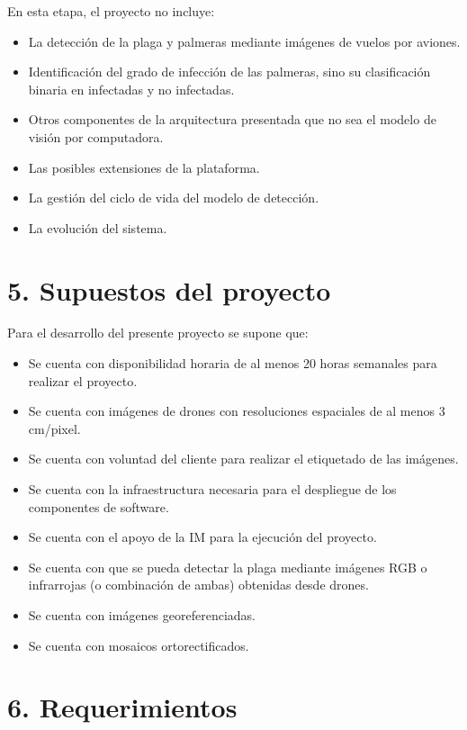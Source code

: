\documentclass[
11pt, %
]{charter}
\begin{document}
En esta etapa, el proyecto no incluye:
\begin{itemize}
  \item La detección de la plaga y palmeras mediante imágenes de vuelos por aviones.
  \item Identificación del grado de infección de las palmeras, sino su clasificación binaria en infectadas y no infectadas.
  \item Otros componentes de la arquitectura presentada que no sea el modelo de visión por computadora.
  \item Las posibles extensiones de la plataforma.
  \item La gestión del ciclo de vida del modelo de detección.
  \item La evolución del sistema.
\end{itemize}

\section{5. Supuestos del proyecto}
\label{sec:supuestos}


Para el desarrollo del presente proyecto se supone que:

\begin{itemize}

  \item Se cuenta con disponibilidad horaria de al menos 20 horas semanales para realizar el proyecto.
  \item Se cuenta con imágenes de drones con resoluciones espaciales de al menos 3 cm/pixel.
  \item Se cuenta con voluntad del cliente para realizar el etiquetado de las imágenes.
  \item Se cuenta con la infraestructura necesaria para el despliegue de los componentes de software.
  \item Se cuenta con el apoyo de la IM para la ejecución del proyecto.
  \item Se cuenta con que se pueda detectar la plaga mediante imágenes RGB o infrarrojas (o combinación de ambas) obtenidas desde drones.
  \item Se cuenta con imágenes georeferenciadas.
  \item Se cuenta con mosaicos ortorectificados.

\end{itemize}

\section{6. Requerimientos}
\label{sec:requerimientos}
\end{document}
